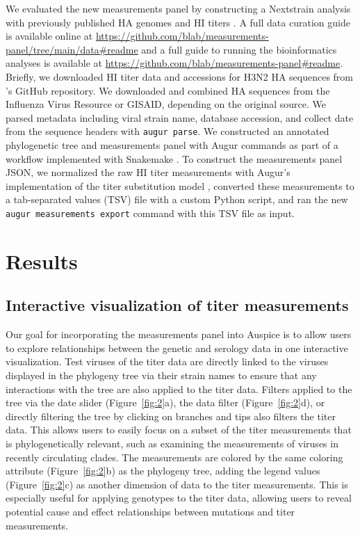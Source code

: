 \documentclass[utf8]{FrontiersinHarvard} %
\begin{document}
We evaluated the new measurements panel by constructing a Nextstrain analysis \citep{Hadfield2018} with previously published HA genomes and HI titers \citep{Bedford:2014bf}.
A full data curation guide is available online at \url{https://github.com/blab/measurements-panel/tree/main/data#readme} and a full guide to running the bioinformatics analyses is available at \url{https://github.com/blab/measurements-panel#readme}.
Briefly, we downloaded HI titer data and accessions for H3N2 HA sequences from \cite{Bedford:2014bf}'s GitHub repository.
We downloaded and combined HA sequences from the Influenza Virus Resource or GISAID, depending on the original source.
We parsed metadata including viral strain name, database accession, and collect date from the sequence headers with \texttt{augur parse}.
We constructed an annotated phylogenetic tree and measurements panel with Augur commands as part of a workflow implemented with Snakemake \citep{Molder2021}.
To construct the measurements panel JSON, we normalized the raw HI titer measurements with Augur's implementation of the titer substitution model \citep{Neher:2016hy}, converted these measurements to a tab-separated values (TSV) file with a custom Python script, and ran the new \texttt{augur measurements export} command with this TSV file as input.

\section{Results}

\subsection{Interactive visualization of titer measurements}

Our goal for incorporating the measurements panel into Auspice is to allow users to explore relationships between the genetic and serology data in one interactive visualization.
Test viruses of the titer data are directly linked to the viruses displayed in the phylogeny tree via their strain names to ensure that any interactions with the tree are also applied to the titer data.
Filters applied to the tree via the date slider (Figure~\ref{fig:2}a), the data filter (Figure~\ref{fig:2}d), or directly filtering the tree by clicking on branches and tips also filters the titer data.
This allows users to easily focus on a subset of the titer measurements that is phylogenetically relevant, such as examining the measurements of viruses in recently circulating clades.
The measurements are colored by the same coloring attribute (Figure~\ref{fig:2}b) as the phylogeny tree, adding the legend values (Figure~\ref{fig:2}c) as another dimension of data to the titer measurements.
This is especially useful for applying genotypes to the titer data, allowing users to reveal potential cause and effect relationships between mutations and titer measurements.
\end{document}
